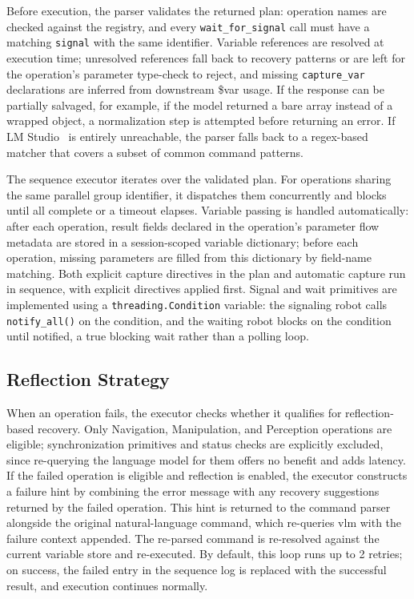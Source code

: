 \documentclass[
     12pt,
     a4paper,
     BCOR=10mm,
     DIV=14,
     listof=totoc,
     bibliography=totoc,
     parskip,
     twoside,
     headsepline
     ]{scrreprt}
\begin{document}
Before execution, the parser validates the returned plan: operation names are checked against the registry, and every \texttt{wait\_for\_signal} call must have a matching \texttt{signal} with the same identifier. Variable references are resolved at execution time; unresolved references fall back to recovery patterns or are left for the operation's parameter type-check to reject, and missing \texttt{capture\_var} declarations are inferred from downstream \$var usage. If the response can be partially salvaged, for example, if the model returned a bare array instead of a wrapped object, a normalization step is attempted before returning an error. If LM Studio~\cite{lmstudio} is entirely unreachable, the parser falls back to a regex-based matcher that covers a subset of common command patterns.

The sequence executor iterates over the validated plan. For operations sharing the same parallel group identifier, it dispatches them concurrently and blocks until all complete or a timeout elapses. Variable passing is handled automatically: after each operation, result fields declared in the operation's parameter flow metadata are stored in a session-scoped variable dictionary; before each operation, missing parameters are filled from this dictionary by field-name matching. Both explicit capture directives in the plan and automatic capture run in sequence, with explicit directives applied first. Signal and wait primitives are implemented using a \texttt{threading.Condition} variable: the signaling robot calls \texttt{notify\_all()} on the condition, and the waiting robot blocks on the condition until notified, a true blocking wait rather than a polling loop.

\subsection{Reflection Strategy}
When an operation fails, the executor checks whether it qualifies for reflection-based recovery. Only Navigation, Manipulation, and Perception operations are eligible; synchronization primitives and status checks are explicitly excluded, since re-querying the language model for them offers no benefit and adds latency. If the failed operation is eligible and reflection is enabled, the executor constructs a failure hint by combining the error message with any recovery suggestions returned by the failed operation. This hint is returned to the command parser alongside the original natural-language command, which re-queries \gls{vlm} with the failure context appended. The re-parsed command is re-resolved against the current variable store and re-executed. By default, this loop runs up to 2 retries; on success, the failed entry in the sequence log is replaced with the successful result, and execution continues normally.
\end{document}
